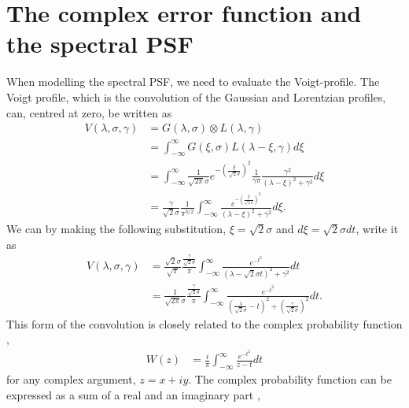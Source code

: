 \documentclass[longauth]{aa}    %
\begin{document}
\section{The complex error function and the spectral PSF} \label{voigt}
When modelling the spectral PSF, we need to evaluate the Voigt-profile. The Voigt profile, which is the convolution of the Gaussian and Lorentzian profiles, can, centred at zero, be written as \citep{pagnini2010} 
\begin{equation} 
\begin{split}
V(\lambda,\sigma, \gamma)  
& = G(\lambda, \sigma)  \otimes L(\lambda, \gamma) \\
& = \int_{-\infty}^{\infty} G(\xi, \sigma) L(\lambda - \xi, \gamma) d\xi \\
& = \int_{-\infty}^{\infty} \frac{1}{\sqrt{2 \pi} \sigma} e^{- \left( \frac{\xi}{\sqrt{2} \sigma}  \right)^2 } \frac{1}{\gamma \pi} \frac{\gamma^2}{(\lambda - \xi)^2 + \gamma^2} d\xi \\
& = \frac{\gamma}{\sqrt{2} \sigma} \frac{1}{ \pi^{3/2}}   \int_{-\infty}^{\infty} \frac{e^{- \left( \frac{\xi}{\sqrt{2} \sigma}  \right)^2 }}{(\lambda - \xi)^2 + \gamma^2} d\xi.
\end{split}
\end{equation}
We can by making the following substitution, $\xi = \sqrt{2} \sigma$ and $d\xi = \sqrt{2} \sigma dt$, write it as
\begin{equation} 
\begin{split}
V(\lambda,\sigma, \gamma)  
& =  \frac{\sqrt{2} \sigma}{ \sqrt{{\pi}}} \frac{\frac{\gamma}{\sqrt{2} \sigma}}{\pi}  \int_{-\infty}^{\infty} \frac{e^{- t^2 }}{(\lambda - \sqrt{2} \sigma t)^2 + \gamma^2} dt \\
& = \frac{1}{\sqrt{2 \pi} \sigma}  \frac{\frac{\gamma}{\sqrt{2} \sigma}}{\pi}  \int_{-\infty}^{\infty} \frac{e^{- t^2 }}{\left(\frac{\lambda}{\sqrt{2} \sigma} -  t\right)^2 + \left(\frac{\gamma}{\sqrt{2} \sigma}\right)^2} dt.	
\end{split}
\end{equation}
This form of the convolution is closely related to the complex probability function \citep{letchworth2007, abrarov2015a},
\begin{equation} 
\begin{split}
W(z)  
& = \frac{i}{\pi} \int_{-\infty}^{\infty} \frac{e^{-t^2}}{z - t}  dt
\end{split}
\end{equation}
for any complex argument, $z = x + iy$. The complex probability function can be expressed as a sum of a real and an imaginary part \citep{benner1995, abrarov2015b},
\end{document}
